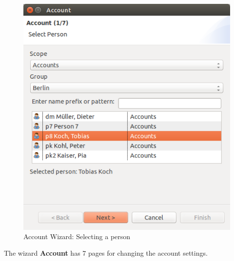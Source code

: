 \documentclass[a4paper,10pt]{book}
\begin{document}
\begin{figure}[htb!]
  \centering
  \includegraphics[scale=.345]{Screenshot/account_wizard-person_page.png}
  \caption{\label{Account Wizard: Selecting a person} Account Wizard: Selecting a person}
\end{figure}

The wizard \textbf{Account} has 7 pages for changing the account settings.
\end{document}
